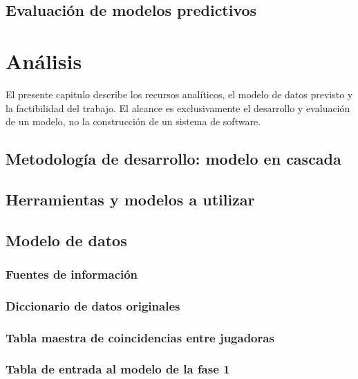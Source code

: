 \documentclass[12pt,letterpaper]{report}
\begin{document}
\section{Evaluación de modelos predictivos}

\chapter{Análisis}
El presente capitulo describe los recursos analíticos, el modelo de datos previsto y la factibilidad del trabajo. El alcance es exclusivamente el desarrollo y evaluación de un modelo, no la construcción de un sistema de software.

\section{Metodología de desarrollo: modelo en cascada}
\label{sec:metodologia-cascada}


\section{Herramientas y modelos a utilizar}


\section{Modelo de datos}
\subsection{Fuentes de información}
\label{subsec:Fuentes_informacion}

\subsection{Diccionario de datos originales}

\subsection{Tabla maestra de coincidencias entre jugadoras}
\label{subsec:tabla-maestra}

\subsection{Tabla de entrada al modelo de la fase 1}
\label{subsec:tabla-entrada-fase1}

\end{document}
